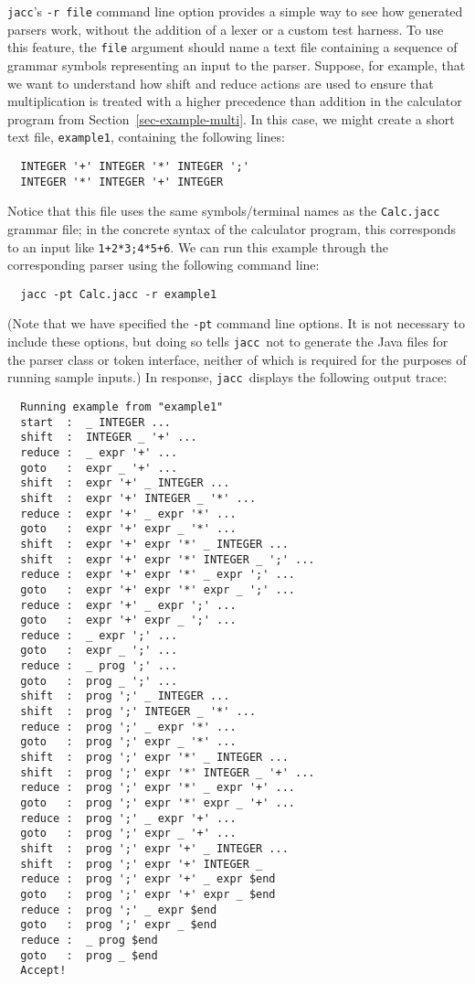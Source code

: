 \documentclass[12pt]{article}
\def\jacc{{\tt jacc}}
\begin{document}
\jacc's \verb"-r file" command line option provides a simple way to
see how generated parsers work, without the addition of a lexer or a
custom test harness.  To use this feature, the \verb"file" argument
should name a text file containing a sequence of grammar symbols
representing an input to the parser.  Suppose, for example, that we
want to understand how shift and reduce actions are used to ensure
that multiplication is treated with a higher precedence than addition
in the calculator program from Section~\ref{sec-example-multi}.  In
this case, we might create a short text file, \verb"example1", containing
the following lines:
{\small
\begin{verbatim}
  INTEGER '+' INTEGER '*' INTEGER ';'
  INTEGER '*' INTEGER '+' INTEGER
\end{verbatim}
}%
Notice that this file uses the same symbols/terminal names as the
\verb"Calc.jacc" grammar file; in the concrete syntax of the calculator
program, this corresponds to an input like \verb"1+2*3;4*5+6".  We can
run this example through the corresponding parser using the following
command line:
{\small
\begin{verbatim}
  jacc -pt Calc.jacc -r example1
\end{verbatim}
}%
(Note that we have specified the \verb"-pt" command line options.  It is
not necessary to include these options, but doing so tells \jacc\ not
to generate the Java files for the parser class or token interface,
neither of which is required for the purposes of running sample inputs.) 
In response, \jacc\ displays the following output trace:
{\small
\begin{verbatim}
  Running example from "example1"
  start  :  _ INTEGER ...
  shift  :  INTEGER _ '+' ...
  reduce :  _ expr '+' ...
  goto   :  expr _ '+' ...
  shift  :  expr '+' _ INTEGER ...
  shift  :  expr '+' INTEGER _ '*' ...
  reduce :  expr '+' _ expr '*' ...
  goto   :  expr '+' expr _ '*' ...
  shift  :  expr '+' expr '*' _ INTEGER ...
  shift  :  expr '+' expr '*' INTEGER _ ';' ...
  reduce :  expr '+' expr '*' _ expr ';' ...
  goto   :  expr '+' expr '*' expr _ ';' ...
  reduce :  expr '+' _ expr ';' ...
  goto   :  expr '+' expr _ ';' ...
  reduce :  _ expr ';' ...
  goto   :  expr _ ';' ...
  reduce :  _ prog ';' ...
  goto   :  prog _ ';' ...
  shift  :  prog ';' _ INTEGER ...
  shift  :  prog ';' INTEGER _ '*' ...
  reduce :  prog ';' _ expr '*' ...
  goto   :  prog ';' expr _ '*' ...
  shift  :  prog ';' expr '*' _ INTEGER ...
  shift  :  prog ';' expr '*' INTEGER _ '+' ...
  reduce :  prog ';' expr '*' _ expr '+' ...
  goto   :  prog ';' expr '*' expr _ '+' ...
  reduce :  prog ';' _ expr '+' ...
  goto   :  prog ';' expr _ '+' ...
  shift  :  prog ';' expr '+' _ INTEGER ...
  shift  :  prog ';' expr '+' INTEGER _
  reduce :  prog ';' expr '+' _ expr $end
  goto   :  prog ';' expr '+' expr _ $end
  reduce :  prog ';' _ expr $end
  goto   :  prog ';' expr _ $end
  reduce :  _ prog $end
  goto   :  prog _ $end
  Accept!
\end{verbatim}
}%
\end{document}
